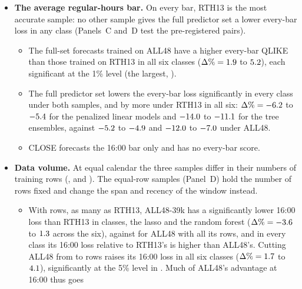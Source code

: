 \begin{itemize}
\begin{itemize}
    \rhtaQHarLgbmRthClose{} to \rhtaQHarLgbmClClose), and their larger full-versus-HAR change under CLOSE reflects
    it.
  \end{itemize}
\item \textbf{The average regular-hours bar.} On every bar, RTH13 is the most accurate sample: no other sample
  gives the full predictor set a lower every-bar loss in any class (Panels~C and~D test the pre-registered pairs).
  \begin{itemize}
  \item The full-set forecasts trained on ALL48 have a higher every-bar QLIKE than those trained on RTH13 in all six
    classes ($\Delta\% = 1.9$ to $5.2$), each significant at the 1\% level
    (the largest, \rhtaAllVsRthBarPMax).
  \item The full predictor set lowers the every-bar loss significantly in every class under both samples, and by more
    under RTH13 in all six: $\Delta\% = -6.2$ to $-5.4$ for the penalized linear models
    and $-14.0$ to $-11.1$ for the tree ensembles, against $-5.2$ to
    $-4.9$ and $-12.0$ to $-7.0$ under ALL48.
  \item CLOSE forecasts the 16:00 bar only and has no every-bar score.
  \end{itemize}
\item \textbf{Data volume.} At equal calendar the three samples differ in their numbers of training rows
  (\rhtaRowsAll, \rhtaRowsRth{} and \rhtaRowsCl). The equal-row samples (Panel~D) hold the number of rows fixed and
  change the span and recency of the window instead.
  \begin{itemize}
  \item With \rhtaRowsLarge{} rows, as many as RTH13, ALL48-39k has a significantly lower 16:00 loss than RTH13 in
    \rhtaNAllThirtyNineKVsRthCloseSig{} classes, the lasso and the random forest
    ($\Delta\% = -3.6$ to $1.3$ across the six),
    against \rhtaNAllVsRthCloseSig{} for ALL48 with all its rows, and in every class its 16:00 loss relative to
    RTH13's is higher than ALL48's. Cutting ALL48 from \rhtaRowsAll{} to \rhtaRowsLarge{} rows raises its 16:00 loss in all six
    classes ($\Delta\% = 1.7$ to $4.1$),
    significantly at the 5\% level in \rhtaNAllThirtyNineKVsAllCloseSig. Much of ALL48's advantage at 16:00 thus goes

\end{itemize}
\end{itemize}
